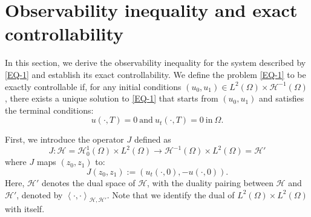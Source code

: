 \documentclass[11pt]{article}
\numberwithin{equation}{section}
\def\Om{\Omega}
\def\mcH{\mathcal{H}}
\begin{document}
		\section{Observability inequality and exact controllability}\label{Se6}
		
		
		
		In this section, we derive the observability inequality for the system described by \eqref{EQ-1} and establish its exact controllability. We define the problem \eqref{EQ-1} to be exactly controllable if, for any initial conditions
		$(u_0,u_1)\in L^2(\Omega) \times \mcH^{-1}(\Om)$, there exists a unique solution to \eqref{EQ-1} that starts from
		$(u_0,u_1)$  and satisfies the terminal conditions:
		\begin{equation*}
			u(\cdot,T)=0 \ \mbox{and} \ u_t (\cdot,T)=0 \ \mbox{in} \ \Omega.
		\end{equation*}
		
		
		
		
		
		First, we introduce the operator $J$ defined as
		\begin{equation*}
			J: \mcH=\mcH_0^1(\Om) \times L^2(\Omega) \to \mcH^{-1}(\Om) \times L^2(\Omega)=\mcH'
		\end{equation*}
		where $J$ maps $(z_0,z_1)$ to:
		\begin{equation*}
			J(z_0,z_1):=\left( u_t (\cdot,0), -u(\cdot,0)\right) .
		\end{equation*}
		Here, $\mcH'$  denotes the dual space of  $\mcH$, with the duality pairing between
		$\mcH$ and $\mcH'$,   denoted by $\left\langle  \cdot,\cdot \right\rangle_{\mcH,\mcH'}$. Note that we identify the dual of
		$L^2(\Omega) \times L^2(\Omega)$  with itself.
		
		
		
\end{document}
